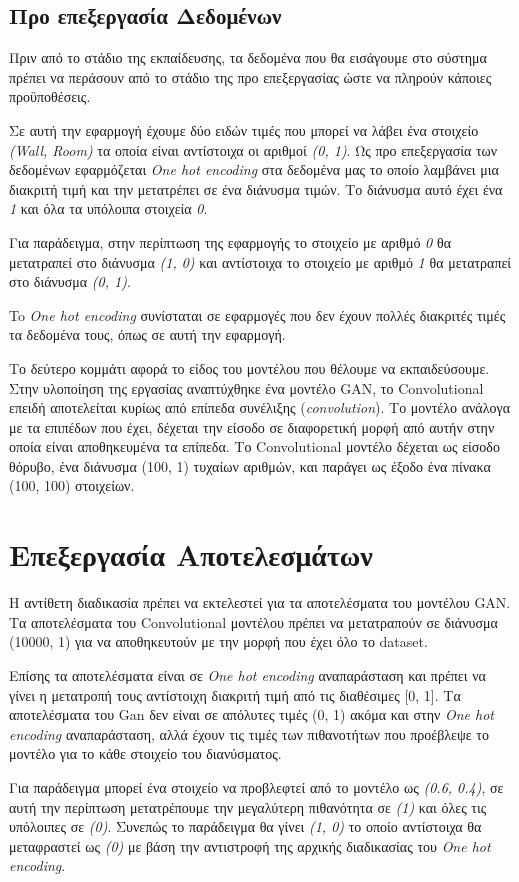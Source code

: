 \subsection{Προ επεξεργασία Δεδομένων}
Πριν από το στάδιο της εκπαίδευσης, τα δεδομένα που θα εισάγουμε στο σύστημα πρέπει να περάσουν από το στάδιο της προ επεξεργασίας ώστε να πληρούν κάποιες προϋποθέσεις.
\par
Σε αυτή την εφαρμογή έχουμε δύο ειδών τιμές που μπορεί να λάβει ένα στοιχείο \textit{(Wall, Room)} τα οποία είναι αντίστοιχα οι αριθμοί \textit{(0, 1)}. Ως προ επεξεργασία των δεδομένων εφαρμόζεται \textit{One hot encoding} στα δεδομένα μας το οποίο λαμβάνει μια διακριτή τιμή και την μετατρέπει σε ένα διάνυσμα τιμών. Το διάνυσμα αυτό έχει ένα \textit{1} και όλα τα υπόλοιπα στοιχεία \textit{0}.
\par
Για παράδειγμα, στην περίπτωση της εφαρμογής το στοιχείο με αριθμό \textit{0} θα μετατραπεί στο διάνυσμα \textit{(1, 0)} και αντίστοιχα το στοιχείο  με αριθμό \textit{1} θα μετατραπεί στο διάνυσμα \textit{(0, 1)}. 
\par
To \textit{One hot encoding} συνίσταται σε εφαρμογές που δεν έχουν πολλές διακριτές τιμές τα δεδομένα τους, όπως σε αυτή την εφαρμογή.

\par
Το δεύτερο κομμάτι αφορά το είδος του μοντέλου που θέλουμε να εκπαιδεύσουμε. Στην υλοποίηση της εργασίας αναπτύχθηκε ένα μοντέλο GAN, το Convolutional επειδή αποτελείται κυρίως από επίπεδα συνέλιξης (\textit{convolution}). Το μοντέλο ανάλογα με τα επιπέδων που έχει, δέχεται την είσοδο σε διαφορετική μορφή από αυτήν στην οποία είναι αποθηκευμένα τα επίπεδα. Το Convolutional μοντέλο δέχεται ως είσοδο θόρυβο, ένα διάνυσμα (100, 1) τυχαίων αριθμών, και παράγει ως έξοδο ένα πίνακα (100, 100) στοιχείων.
\par


\section{Επεξεργασία Αποτελεσμάτων}
Η αντίθετη διαδικασία πρέπει να εκτελεστεί για τα αποτελέσματα του μοντέλου GAN. Τα αποτελέσματα του Convolutional μοντέλου πρέπει να μετατραπούν σε διάνυσμα (10000, 1) για να αποθηκευτούν με την μορφή που έχει όλο το dataset.
\par
Επίσης τα αποτελέσματα είναι σε \textit{One hot encoding} αναπαράσταση και πρέπει να γίνει η μετατροπή τους αντίστοιχη διακριτή τιμή από τις διαθέσιμες [0, 1]. Τα αποτελέσματα του Gan δεν είναι σε απόλυτες τιμές (0, 1) ακόμα και στην \textit{One hot encoding} αναπαράσταση, αλλά έχουν τις τιμές των πιθανοτήτων που προέβλεψε το μοντέλο για το κάθε στοιχείο του διανύσματος. 
\par
Για παράδειγμα μπορεί ένα στοιχείο να προβλεφτεί από το μοντέλο ως \textit{(0.6, 0.4)}, σε αυτή την περίπτωση μετατρέπουμε την μεγαλύτερη πιθανότητα σε \textit{(1)} και όλες τις υπόλοιπες σε \textit{(0)}. Συνεπώς το παράδειγμα θα γίνει \textit{(1, 0)} το οποίο αντίστοιχα θα μεταφραστεί ως \textit{(0)} με βάση την αντιστροφή της αρχικής διαδικασίας του \textit{One hot encoding}.



